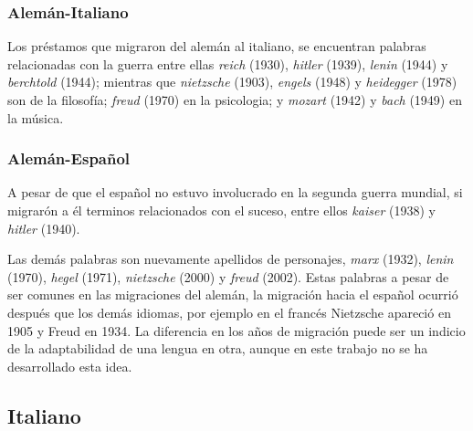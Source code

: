 \subsubsection*{Alemán-Italiano}%

Los préstamos que migraron del alemán al italiano,  se encuentran palabras relacionadas con la guerra  entre ellas \textit{reich} (1930),  \textit{hitler} (1939), \textit{lenin} (1944) y \textit{berchtold} (1944); mientras que 
\textit{nietzsche} (1903),  \textit{engels} (1948) y  \textit{heidegger} (1978) son de la filosofía; \textit{freud} (1970) en la psicologia; y \textit{mozart} (1942) y \textit{bach} (1949) en la música. 





  
\subsubsection*{Alemán-Español}%

A pesar de que el español no estuvo involucrado en la segunda guerra mundial, si migrarón a él terminos relacionados con el suceso,  entre ellos \textit{kaiser} (1938) y \textit{hitler} (1940). 

Las demás palabras son nuevamente  apellidos de personajes, \textit{marx} (1932), \textit{lenin} (1970), \textit{hegel} (1971),  \textit{nietzsche} (2000) y \textit{freud} (2002). Estas palabras a pesar de ser comunes en las migraciones del alemán, la migración hacia el español ocurrió después que los demás idiomas, por ejemplo en el francés Nietzsche apareció en 1905 y Freud en 1934. La diferencia en los años de migración puede ser un indicio de la adaptabilidad de una lengua en otra, aunque en este trabajo no se ha desarrollado esta idea. 





\subsection{Italiano}
 
